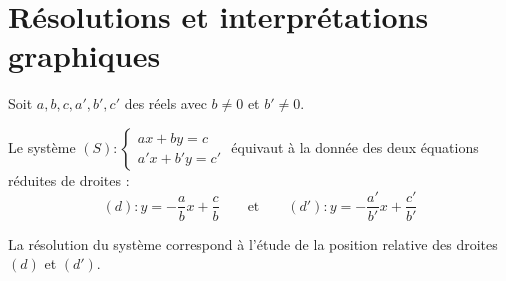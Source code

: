 \section{Résolutions et interprétations graphiques}

Soit $a, b, c, a', b', c'$ des réels avec $b \neq 0$ et $b' \neq 0$.

Le système $(S) : \begin{cases} ax + by = c \\ a'x + b'y = c' \end{cases}$ équivaut à la donnée des deux équations réduites de droites :
\[
	(d) : y = -\frac{a}{b}x + \frac{c}{b}
	\qquad \text{et} \qquad
	(d') : y = -\frac{a'}{b'}x + \frac{c'}{b'}
\]

La résolution du système correspond à l'étude de la position relative des droites $(d)$ et $(d')$.

